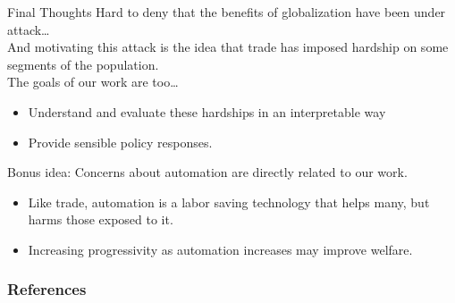\documentclass[9pt,pdftex]{beamer}
\theoremstyle{definition}
\begin{document}



\begin{frame}[t]{Final Thoughts}
Hard to deny that the benefits of globalization have been under attack\ldots\\
And motivating this attack is the idea that trade has imposed hardship on some segments of the population.\\
\bigskip
The goals of our work are too\ldots
\begin{itemize}
\item Understand and evaluate these hardships in an interpretable way
\smallskip
\item Provide sensible policy responses.
\end{itemize}
\bigskip
\smallskip
Bonus idea: Concerns about automation are directly related to our work.
\begin{itemize}
\item Like trade, automation is a labor saving technology that helps many, but harms those exposed to it.
\smallskip
\item Increasing progressivity as automation increases may improve welfare.
\end{itemize}
\bigskip
\end{frame}


\appendix

\setcounter{finalframe}{\value{framenumber}}


\begin{frame}[allowframebreaks]
\frametitle{References}
\footnotesize

\end{frame}
\end{document}
